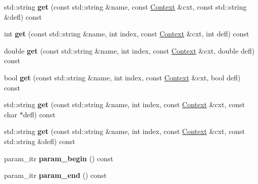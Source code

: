 \begin{DoxyCompactItemize}
\item 
\hypertarget{classcfg_1_1CfgDocument_a88fa62b435821b5ac383b1590ec6b7c5}{std\-::string {\bfseries get} (const std\-::string \&name, const \hyperlink{classcfg_1_1Context}{Context} \&cxt, const std\-::string \&defl) const }\label{classcfg_1_1CfgDocument_a88fa62b435821b5ac383b1590ec6b7c5}

\item 
\hypertarget{classcfg_1_1CfgDocument_abfbca1fb73590965a5d13cfaea5a673a}{int {\bfseries get} (const std\-::string \&name, int index, const \hyperlink{classcfg_1_1Context}{Context} \&cxt, int defl) const }\label{classcfg_1_1CfgDocument_abfbca1fb73590965a5d13cfaea5a673a}

\item 
\hypertarget{classcfg_1_1CfgDocument_afdf2735d5bf9f4272bf960042310e9e6}{double {\bfseries get} (const std\-::string \&name, int index, const \hyperlink{classcfg_1_1Context}{Context} \&cxt, double defl) const }\label{classcfg_1_1CfgDocument_afdf2735d5bf9f4272bf960042310e9e6}

\item 
\hypertarget{classcfg_1_1CfgDocument_a991d7e1aa02b091cd000f0f00a8ab122}{bool {\bfseries get} (const std\-::string \&name, int index, const \hyperlink{classcfg_1_1Context}{Context} \&cxt, bool defl) const }\label{classcfg_1_1CfgDocument_a991d7e1aa02b091cd000f0f00a8ab122}

\item 
\hypertarget{classcfg_1_1CfgDocument_a9742250a76addffa269e2035362aebe1}{std\-::string {\bfseries get} (const std\-::string \&name, int index, const \hyperlink{classcfg_1_1Context}{Context} \&cxt, const char $\ast$defl) const }\label{classcfg_1_1CfgDocument_a9742250a76addffa269e2035362aebe1}

\item 
\hypertarget{classcfg_1_1CfgDocument_a923b2862c1126f0193a7e8a9e51302dd}{std\-::string {\bfseries get} (const std\-::string \&name, int index, const \hyperlink{classcfg_1_1Context}{Context} \&cxt, const std\-::string \&defl) const }\label{classcfg_1_1CfgDocument_a923b2862c1126f0193a7e8a9e51302dd}

\item 
\hypertarget{classcfg_1_1CfgDocument_ac2f9bd72ddc1e1ddec9d7cec23bc20af}{param\-\_\-itr {\bfseries param\-\_\-begin} () const }\label{classcfg_1_1CfgDocument_ac2f9bd72ddc1e1ddec9d7cec23bc20af}

\item 
\hypertarget{classcfg_1_1CfgDocument_acdc088167b35b8b9a061dfa39e67a829}{param\-\_\-itr {\bfseries param\-\_\-end} () const }\label{classcfg_1_1CfgDocument_acdc088167b35b8b9a061dfa39e67a829}


\end{DoxyCompactItemize}
